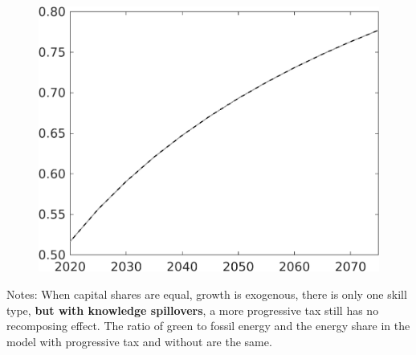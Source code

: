 \documentclass[12pt]{article}
\begin{document}
\begin{figure}[h!!]
\begin{minipage}[]{0.32\textwidth}
\end{minipage}		
\begin{minipage}[]{0.32\textwidth}
\includegraphics[width=1\textwidth]{../../codding_model/own_basedOnFried/optimalPol_010922_revision/figures/all_13Sept22/CompTaul_Equlab_LFBAU_Reg0_LgLf_spillover0_nsk1_xgr1_knspil0_sep1_countec0_GovRev0_etaa0.79_lgd0.png}
\end{minipage}			
	
	
\end{figure}
Notes: When capital shares are equal, growth is exogenous, there is only one skill type, \textbf{but with knowledge spillovers}, a more progressive tax still has no recomposing effect. The ratio of green to fossil energy and the energy share in the model with progressive tax and without are the same. 
\end{document}
